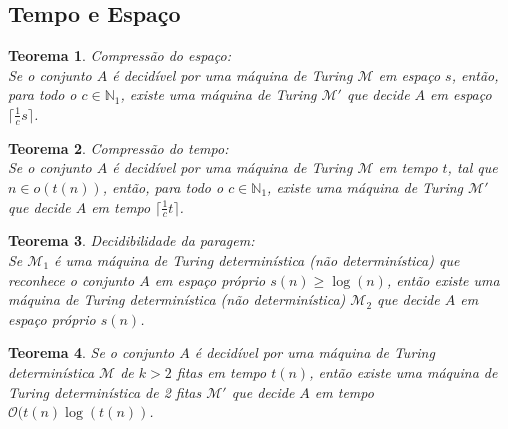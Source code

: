 \documentclass[10pt,a4paper]{report}
\newtheorem{theorem}{Teorema}
\begin{document}
\subsection{Tempo e Espaço}
\begin{theorem} Compressão do espaço:\\
Se o conjunto $A$ é decidível por uma máquina de Turing $\mathcal{M}$ em espaço $s$, então, para todo o $c \in \mathbb{N}_1$, existe uma
máquina de Turing $\mathcal{M}'$ que decide $A$ em espaço $\lceil \frac{1}{c}s\rceil$.
\end{theorem}
\begin{theorem} Compressão do tempo:\\
Se o conjunto $A$ é decidível por uma máquina de Turing $\mathcal{M}$ em tempo $t$, tal que $n \in o(t(n))$, então, para todo o $c \in \mathbb{N}_1$, existe uma máquina de Turing $\mathcal{M}'$ que decide $A$ em tempo $\lceil \frac{1}{c}t\rceil$.
\end{theorem}
\begin{theorem} Decidibilidade da paragem:\\
Se $\mathcal{M}_1$ é uma máquina de Turing determinística (não determinística) que reconhece o conjunto $A$ em espaço próprio $s(n) \geq \log (n)$, então existe uma máquina de Turing determinística (não determinística) $\mathcal{M}_2$ que decide $A$ em espaço próprio $s(n)$.
\end{theorem}
\begin{theorem}
Se o conjunto $A$ é decidível por uma máquina de Turing determinística $\mathcal{M}$ de $k > 2$ fitas em tempo $t(n)$, então existe uma máquina de Turing determinística de 2 fitas $\mathcal{M}'$ que decide $A$ em tempo $\mathcal{O}(t(n) \log (t(n))$.
\end{theorem}
\end{document}
